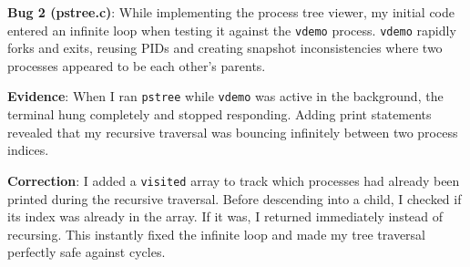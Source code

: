 \documentclass[11pt,a4paper]{article}
\begin{document}
\begin{sloppypar}
\textbf{Bug 2 (pstree.c)}: While implementing the process tree viewer, my initial code entered an infinite loop when testing it against the \texttt{vdemo} process. \texttt{vdemo} rapidly forks and exits, reusing PIDs and creating snapshot inconsistencies where two processes appeared to be each other's parents.

\textbf{Evidence}: When I ran \texttt{pstree} while \texttt{vdemo} was active in the background, the terminal hung completely and stopped responding. Adding print statements revealed that my recursive traversal was bouncing infinitely between two process indices.

\textbf{Correction}: I added a \texttt{visited} array to track which processes had already been printed during the recursive traversal. Before descending into a child, I checked if its index was already in the array. If it was, I returned immediately instead of recursing. This instantly fixed the infinite loop and made my tree traversal perfectly safe against cycles.
\end{sloppypar}
\end{document}

